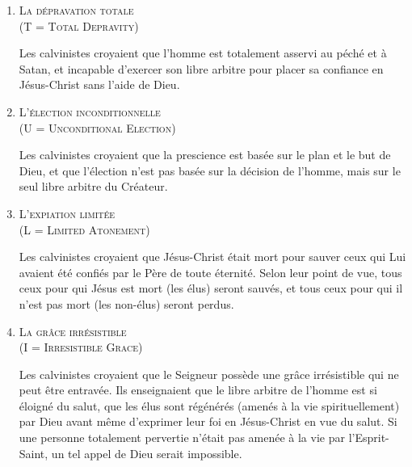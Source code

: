 \begin{enumerate}

  \item  \textsc{La dépravation totale\\\nobreak (\og T \fg{} = Total Depravity)}

\nobreak
Les calvinistes croyaient que l'hom\-me est totalement 
 asservi au péché  et à Satan,
 et incapable d'exercer son libre arbitre 
 pour placer sa confiance en Jésus-Christ sans l'aide de Dieu.

  \item  \textsc{L'élection inconditionnelle\\\nobreak (\og U \fg{} = Unconditional Election)}

\nobreak
Les calvinistes croyaient que la prescience 
 est basée sur le plan et le but de Dieu, et que l'élection
 n'est pas basée sur la décision de l'homme, mais sur le seul \og libre arbitre \fg{}
 du Créateur.

\pocketpagebreak
  \item  \textsc{L'expiation limitée\\\nobreak (\og L \fg{} = Limited Atonement)}

\nobreak
Les calvinistes croyaient que Jésus-Christ était mort pour sauver
 ceux qui Lui avaient été confiés par le Père de toute éternité.
 Selon leur point de vue, tous ceux pour qui Jésus est mort (les élus) seront sauvés,
 et tous ceux pour qui il n'est pas mort (les non-élus) seront perdus.

  \item  \textsc{La grâce irrésistible\\\nobreak (\og I \fg{} = Irresistible Grace)}

\nobreak
\begin{specialpar}{}
Les calvinistes croyaient que le Seigneur possède une grâce irrésistible
 qui ne peut être entravée. Ils enseignaient que le libre arbitre de l'hom\-me
 est si éloigné du salut, que les élus sont régénérés (amenés à la vie spirituellement)
 par Dieu avant \pocketlinebreak
 même d'exprimer leur foi en Jésus-Christ en vue du salut.
 Si une per\-son\-ne totalement pervertie n'était pas amenée à la vie par l'Esprit-Saint,
 un tel appel de Dieu serait impossible.
\end{specialpar}


\end{enumerate}
